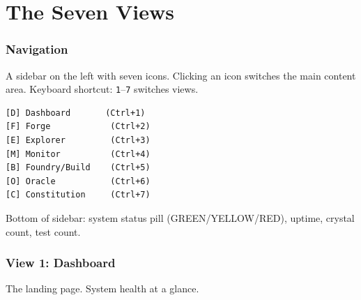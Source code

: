 \documentclass[11pt,a4paper,twoside]{article}
\begin{document}
\part{The Seven Views}\label{part:views}

\section{Navigation}\label{sec:nav}

A sidebar on the left with seven icons. Clicking an icon switches
the main content area. Keyboard shortcut: \texttt{1}--\texttt{7}
switches views.

\begin{lstlisting}[title={Sidebar Navigation}]
[D] Dashboard       (Ctrl+1)
[F] Forge            (Ctrl+2)
[E] Explorer         (Ctrl+3)
[M] Monitor          (Ctrl+4)
[B] Foundry/Build    (Ctrl+5)
[O] Oracle           (Ctrl+6)
[C] Constitution     (Ctrl+7)
\end{lstlisting}

Bottom of sidebar: system status pill (GREEN/YELLOW/RED), uptime,
crystal count, test count.


\section{View 1: Dashboard}\label{sec:dashboard}

The landing page. System health at a glance.
\end{document}
